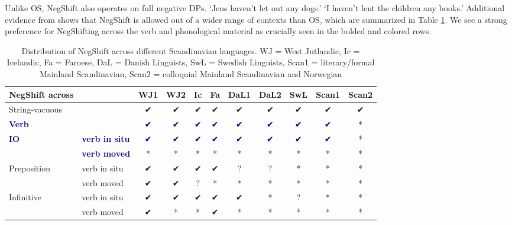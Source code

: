 \documentclass[12pt, letterpaper]{article}
\begin{document}
\ex Unlike OS, NegShift also operates on full negative DPs.
			\glt `Jens haven't let out any dogs.'
			\glt `I haven't lent the children any books.'
		\z
\ex Additional evidence from \citet{engelsScandinavianNegativeIndefinites2012} shows that NegShift is allowed out of a wider range of contexts than OS, which are summarized in Table \ref{tab:Distribution}.
	\ea We see a strong preference for NegShifting across the verb and phonological material as crucially seen in the bolded and colored rows. 
	\z 
\begin{table}[!ht]
	\centering
	\caption{Distribution of NegShift across different Scandinavian languages. WJ = West Jutlandic, Ic = Icelandic, Fa = Faroese, DaL = Danish Linguists, SwL = Swedish Linguists, Scan1 = literary/formal Mainland Scandinavian, Scan2 = colloquial Mainland Scandinavian and Norwegian}
	\label{tab:Distribution}
\begin{tabular}{llccccccccc}
	\hline 
	NegShift across &  & WJ1 & WJ2 & Ic & Fa & DaL1 & DaL2 & SwL & Scan1 & Scan2 \\ 
	\hline 
	String-vacuous &  & ✔︎ & ✔︎ & ✔︎ & ✔︎ & ✔︎ & ✔︎ & ✔︎ & ✔︎ & ✔︎ \\ 
	\textcolor{DarkBlue}{\textbf{Verb}} &  & \textcolor{DarkBlue}{✔︎} & \textcolor{DarkBlue}{✔︎} & \textcolor{DarkBlue}{✔︎} & \textcolor{DarkBlue}{✔︎} & \textcolor{DarkBlue}{✔︎} & \textcolor{DarkBlue}{✔︎} & \textcolor{DarkBlue}{✔︎} & \textcolor{DarkBlue}{✔︎} & \textcolor{DarkBlue}{*} \\ 
	\textcolor{DarkBlue}{\textbf{IO}} & \textcolor{DarkBlue}{\textbf{verb in situ}} & \textcolor{DarkBlue}{✔︎} & \textcolor{DarkBlue}{✔︎} & \textcolor{DarkBlue}{✔︎} & \textcolor{DarkBlue}{✔︎} & \textcolor{DarkBlue}{✔︎} & \textcolor{DarkBlue}{✔︎} & \textcolor{DarkBlue}{✔︎} & \textcolor{DarkBlue}{✔︎} & \textcolor{DarkBlue}{*} \\ 
	& \textcolor{DarkBlue}{\textbf{verb moved}} & \textcolor{DarkBlue}{*} & \textcolor{DarkBlue}{*} & \textcolor{DarkBlue}{*} & \textcolor{DarkBlue}{*} & \textcolor{DarkBlue}{*} & \textcolor{DarkBlue}{*} & \textcolor{DarkBlue}{*} & \textcolor{DarkBlue}{*} & \textcolor{DarkBlue}{*} \\ 
	Preposition & verb in situ & ✔︎ & ✔︎ & ✔︎ & ✔︎ & ? & ? & * & * & * \\ 
	& verb moved & ✔︎ & ✔︎ & ? & * & * & * & * & * & * \\ 
	Infinitive & verb in situ & ✔︎ & ✔︎ & ✔︎ & ✔︎ & ✔︎ & * & ? & * & * \\ 
	& verb moved & ✔︎ & * & * & ✔︎ & * & * & * & * & * \\ 
	\hline 
\end{tabular} 
\end{table}
\z
\end{document}
